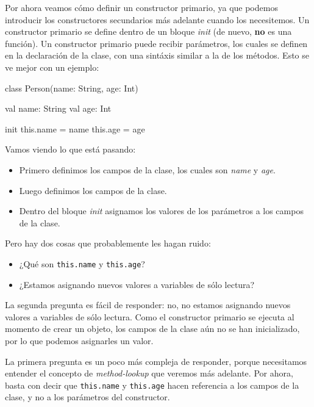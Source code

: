     Por ahora veamos cómo definir un constructor primario, ya que podemos introducir los 
    constructores secundarios más adelante cuando los necesitemos.
    Un constructor primario se define dentro de un bloque \textit{init} (de nuevo, \textbf{no} es 
    una función).
    Un constructor primario puede recibir parámetros, los cuales se definen en la declaración de la
    clase, con una sintáxis similar a la de los métodos.
    Esto se ve mejor con un ejemplo:
    
    \begin{kotlin}
      class Person(name: String, age: Int) {
        val name: String
        val age: Int

        init {
          this.name = name
          this.age = age
        }
      }
    \end{kotlin}
    
    Vamos viendo lo que está pasando:

    \begin{itemize}
      \item Primero definimos los campos de la clase, los cuales son \textit{name} y \textit{age}.
      \item Luego definimos los campos de la clase.
      \item Dentro del bloque \textit{init} asignamos los valores de los parámetros a los campos de
        la clase.
    \end{itemize}

    Pero hay dos cosas que probablemente les hagan ruido:

    \begin{itemize}
      \item ¿Qué son \texttt{this.name} y \texttt{this.age}?
      \item ¿Estamos asignando nuevos valores a variables de sólo lectura? 
    \end{itemize}

    La segunda pregunta es fácil de responder: no, no estamos asignando nuevos valores a variables 
    de sólo lectura.
    Como el constructor primario se ejecuta al momento de crear un objeto, los campos de la clase
    aún no se han inicializado, por lo que podemos asignarles un valor.

    La primera pregunta es un poco más compleja de responder, porque necesitamos entender el 
    concepto de \textit{method-lookup} que veremos más adelante.
    Por ahora, basta con decir que \texttt{this.name} y \texttt{this.age} hacen referencia a los
    campos de la clase, y no a los parámetros del constructor.

